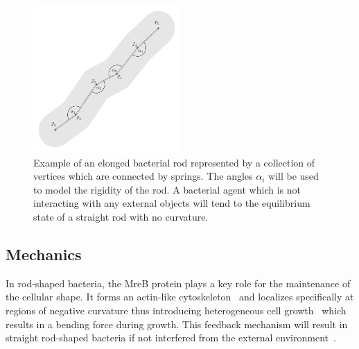 \documentclass{article}
\begin{document}
\begin{figure}
    \centering
    \includegraphics[width=0.5\textwidth]{docs/source/_static/mechanics.png}
    \caption{
        Example of an elonged bacterial rod represented by a collection of vertices which are
        connected by springs.
        The angles $\alpha_i$ will be used to model the rigidity of the rod.
        A bacterial agent which is not interacting with any external objects will tend to the
        equilibrium state of a straight rod with no curvature.
    }
    \label{fig:mechanics-bacterium}
\end{figure}

\subsection{Mechanics}
\label{subsection:mechanical-model-mechanics}
In rod-shaped bacteria, the MreB protein plays a key role for the maintenance of the cellular shape.
It forms an actin-like cytoskeleton~\cite{Erickson2001,Dersch2020} and localizes specifically at
regions of negative curvature thus introducing heterogeneous cell growth~\cite{Ursell2014} which
results in a bending force during growth.
This feedback mechanism will result in straight rod-shaped bacteria if not interfered from the
external environment~\cite{Wang2010}.
\end{document}
